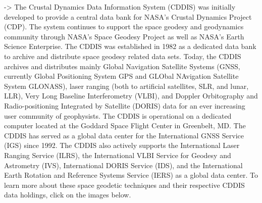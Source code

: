 \cite{cddisnasa} -> The Crustal Dynamics Data Information System (CDDIS) was initially developed to provide a central data bank for NASA's Crustal Dynamics Project (CDP). The system continues to support the space geodesy and geodynamics community through NASA's Space Geodesy Project as well as NASA's Earth Science Enterprise. The CDDIS was established in 1982 as a dedicated data bank to archive and distribute space geodesy related data sets. Today, the CDDIS archives and distributes mainly Global Navigation Satellite Systems (GNSS, currently Global Positioning System GPS and GLObal NAvigation Satellite System GLONASS), laser ranging (both to artificial satellites, SLR, and lunar, LLR), Very Long Baseline Interferometry (VLBI), and Doppler Orbitography and Radio-positioning Integrated by Satellite (DORIS) data for an ever increasing user community of geophysists.
The CDDIS is operational on a dedicated computer located at the Goddard Space Flight Center in Greenbelt, MD.
The CDDIS has served as a global data center for the International GNSS Service (IGS) since 1992. The CDDIS also actively supports the International Laser Ranging Service (ILRS), the International VLBI Service for Geodesy and Astrometry (IVS), International DORIS Service (IDS), and the International Earth Rotation and Reference Systems Service (IERS) as a global data center.
To learn more about these space geodetic techniques and their respective CDDIS data holdings, click on the images below.

